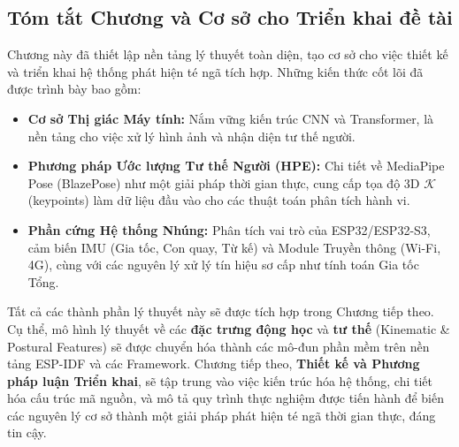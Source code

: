 \subsection{Tóm tắt Chương và Cơ sở cho Triển khai đề tài}
\label{sec:chapter_conclusion}

Chương này đã thiết lập nền tảng lý thuyết toàn diện, tạo cơ sở cho việc thiết kế và triển khai hệ thống phát hiện té ngã tích hợp. Những kiến thức cốt lõi đã được trình bày bao gồm:
\begin{itemize}
    \item \textbf{Cơ sở Thị giác Máy tính:} Nắm vững kiến trúc CNN và Transformer, là nền tảng cho việc xử lý hình ảnh và nhận diện tư thế người.
    \item \textbf{Phương pháp Ước lượng Tư thế Người (HPE):} Chi tiết về MediaPipe Pose (BlazePose) như một giải pháp thời gian thực, cung cấp tọa độ 3D $\mathcal{K}$ (keypoints) làm dữ liệu đầu vào cho các thuật toán phân tích hành vi.
    \item \textbf{Phần cứng Hệ thống Nhúng:} Phân tích vai trò của ESP32/ESP32-S3, cảm biến IMU (Gia tốc, Con quay, Từ kế) và Module Truyền thông (Wi-Fi, 4G), cùng với các nguyên lý xử lý tín hiệu sơ cấp như tính toán Gia tốc Tổng.
\end{itemize}

Tất cả các thành phần lý thuyết này sẽ được tích hợp trong Chương tiếp theo. Cụ thể, mô hình lý thuyết về các \textbf{đặc trưng động học} và \textbf{tư thế} (Kinematic \& Postural Features) sẽ được chuyển hóa thành các mô-đun phần mềm trên nền tảng ESP-IDF và các Framework. Chương tiếp theo, \textbf{Thiết kế và Phương pháp luận Triển khai}, sẽ tập trung vào việc kiến trúc hóa hệ thống, chi tiết hóa cấu trúc mã nguồn, và mô tả quy trình thực nghiệm được tiến hành để biến các nguyên lý cơ sở thành một giải pháp phát hiện té ngã thời gian thực, đáng tin cậy.
